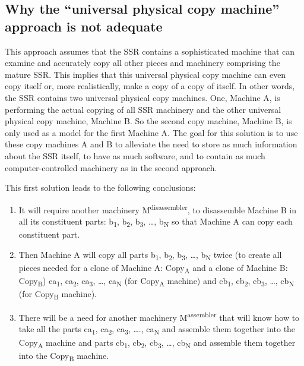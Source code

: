 \subsection[Why the “universal physical copy machine” approach is not adequate]{Why
the “universal physical copy machine” approach is not adequate}

This approach assumes that the
SSR contains a sophisticated machine that can examine and accurately
copy all other pieces and machinery comprising the mature SSR. This
implies that this universal physical copy machine can even copy itself or, more
realistically, make a copy of a copy of itself. In other words, the SSR contains two
universal physical copy machines.  One, Machine A, is performing the actual copying of
all SSR machinery and the other universal physical copy machine,
Machine B. So the second copy machine, Machine B, is only used as a
model for the first Machine A. The goal for this solution is
to use these copy machines A and B to alleviate the need to store
as much information about the SSR itself, to have as much software, and to contain as much
computer-controlled machinery as in the second approach.

This first solution leads to the following conclusions:

\begin{enumerate}
\item It will require another machinery
M\textsuperscript{disassembler}, to disassemble Machine B in all its
constituent parts: b\textsubscript{1}, b\textsubscript{2},
b\textsubscript{3}, …, b\textsubscript{N }so that Machine A can copy
each constituent part.
\item Then Machine A will copy all parts b\textsubscript{1},
b\textsubscript{2}, b\textsubscript{3}, …, b\textsubscript{N} twice (to
create all pieces needed for a clone of Machine A: Copy\textsubscript{A}
and a clone of Machine B: Copy\textsubscript{B}) ca\textsubscript{1},
ca\textsubscript{2}, ca\textsubscript{3}, …, ca\textsubscript{N }(for
Copy\textsubscript{A} machine) and cb\textsubscript{1},
cb\textsubscript{2}, cb\textsubscript{3}, …, cb\textsubscript{N} (for
Copy\textsubscript{B} machine).
\item There will be a need for another machinery
M\textsuperscript{assembler} that will know how to take all the parts
ca\textsubscript{1}, ca\textsubscript{2}, ca\textsubscript{3}, ….,
ca\textsubscript{N} and assemble them together into the
Copy\textsubscript{A} machine and parts cb\textsubscript{1},
cb\textsubscript{2}, cb\textsubscript{3}, …, cb\textsubscript{N} and
assemble them together into the Copy\textsubscript{B} machine. 
\end{enumerate}

